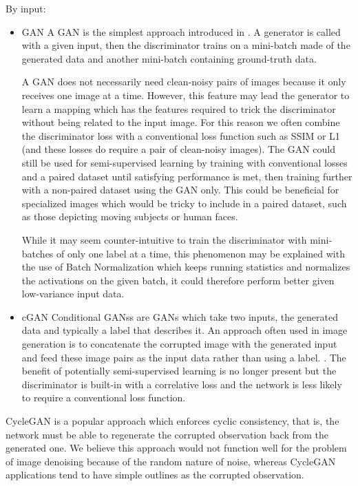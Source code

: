 By input:
\begin{itemize}
  \item \ac{GAN}
  A \ac{GAN} is the simplest approach introduced in \cite{gan}. A generator is called with a given input, then the discriminator trains on a mini-batch made of the generated data and another mini-batch containing ground-truth data.

A \ac{GAN} does not necessarily need clean-noisy pairs of images because it only receives one image at a time. However, this feature may lead the generator to learn a mapping which has the features required to trick the discriminator without being related to the input image. For this reason we often combine the discriminator loss with a conventional loss function such as SSIM or L1 (and these losses do require a pair of clean-noisy images). The GAN could still be used for semi-supervised learning by training with conventional losses and a paired dataset until satisfying performance is met, then training further with a non-paired dataset using the GAN only. This could be beneficial for specialized images which would be tricky to include in a paired dataset, such as those depicting moving subjects or human faces.

While it may seem counter-intuitive to train the discriminator with mini-batches of only one label at a time, this phenomenon may be explained with the use of Batch Normalization which keeps running statistics and normalizes the activations on the given batch, it could therefore perform better given low-variance input data. \cite{gantechniques}\cite{bn} %
  \item \ac{cGAN}
  Conditional \acsp{GANs} are GANs which take two inputs, the generated data and typically a label that describes it. An approach often used in image generation is to concatenate the corrupted image with the generated input and feed these image pairs as the input data rather than using a label. \cite{pix2pix}\cite{cyclegan}\cite{pix2pixhd}. The benefit of potentially semi-supervised learning is no longer present but the discriminator is built-in with a correlative loss and the network is less likely to require a conventional loss function.
\end{itemize}
CycleGAN\cite{cyclegan} is a popular approach which enforces cyclic consistency, that is, the network must be able to regenerate the corrupted observation back from the generated one. We believe this approach would not function well for the problem of image denoising because of the random nature of noise, whereas CycleGAN applications tend to have simple outlines as the corrupted observation.

